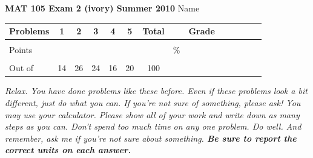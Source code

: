 \documentclass[12pt]{article}
\begin{document}
\textbf{MAT 105 Exam 2 (ivory) Summer 2010} \hspace{.4in} {\large Name} \hrulefill

\begin{center}

\begin{tabular}
{|l|c|c|c|c|c|c|c|c|c|c|c|c|c|} \hline

 Problems & \hspace{5 pt} 1 \hspace{5 pt}  & \hspace{5 pt} 2 \hspace{5 pt} & \hspace{5 pt} 3  \hspace{5 pt} & \hspace{5 pt} 4  \hspace{5 pt} & \hspace{5 pt}5 \hspace{5 pt} & \hspace{5 pt} Total  \hspace{5 pt} & &  \hspace{5 pt} Grade \hspace{5 pt}  \\ \hline
&&&&&&&&\\  
Points &&&&&&&    \hspace{.8in}\% &  \\ 
&&&&&&&& \\  \hline
Out of & 14 & 26 & 24  & 16 & 20 &100 & & \\ \hline

\end {tabular}

\end{center}

\vspace{.2in}

 \emph{Relax.  You have done problems like these before.  Even if these problems look a bit different, just do what you can.  If you're not sure of something, please ask! You may use your calculator.  Please show all of your work and write down as many steps as you can.  Don't spend too much time on any one problem.  Do well.  And remember, ask me if you're not sure about something.  \textbf{Be sure to report the correct units on each answer.}}

\hrulefill
\end{document}
